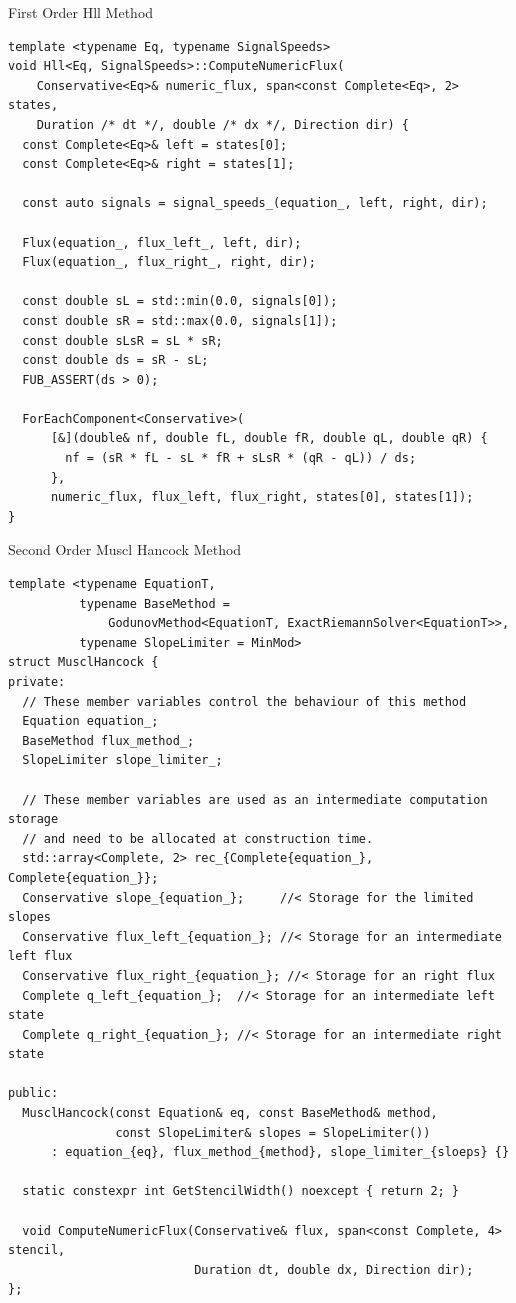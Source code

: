 \documentclass[ucs,9pt]{beamer}
\begin{document}
\begin{frame}[fragile]{First Order Hll Method}
\begin{lstlisting}
template <typename Eq, typename SignalSpeeds>
void Hll<Eq, SignalSpeeds>::ComputeNumericFlux(
    Conservative<Eq>& numeric_flux, span<const Complete<Eq>, 2> states,
    Duration /* dt */, double /* dx */, Direction dir) {
  const Complete<Eq>& left = states[0];
  const Complete<Eq>& right = states[1];

  const auto signals = signal_speeds_(equation_, left, right, dir);

  Flux(equation_, flux_left_, left, dir);
  Flux(equation_, flux_right_, right, dir);

  const double sL = std::min(0.0, signals[0]);
  const double sR = std::max(0.0, signals[1]);
  const double sLsR = sL * sR;
  const double ds = sR - sL;
  FUB_ASSERT(ds > 0);

  ForEachComponent<Conservative>(
      [&](double& nf, double fL, double fR, double qL, double qR) {
        nf = (sR * fL - sL * fR + sLsR * (qR - qL)) / ds;
      },
      numeric_flux, flux_left, flux_right, states[0], states[1]);
}
\end{lstlisting}
\end{frame}


\begin{frame}[fragile]{Second Order Muscl Hancock Method}
\begin{lstlisting}
template <typename EquationT,
          typename BaseMethod =
              GodunovMethod<EquationT, ExactRiemannSolver<EquationT>>,
          typename SlopeLimiter = MinMod>
struct MusclHancock {
private:
  // These member variables control the behaviour of this method
  Equation equation_;
  BaseMethod flux_method_;
  SlopeLimiter slope_limiter_;

  // These member variables are used as an intermediate computation storage
  // and need to be allocated at construction time.
  std::array<Complete, 2> rec_{Complete{equation_}, Complete{equation_}};
  Conservative slope_{equation_};     //< Storage for the limited slopes
  Conservative flux_left_{equation_}; //< Storage for an intermediate left flux
  Conservative flux_right_{equation_}; //< Storage for an right flux
  Complete q_left_{equation_};  //< Storage for an intermediate left state
  Complete q_right_{equation_}; //< Storage for an intermediate right state

public:
  MusclHancock(const Equation& eq, const BaseMethod& method, 
               const SlopeLimiter& slopes = SlopeLimiter())
      : equation_{eq}, flux_method_{method}, slope_limiter_{sloeps} {}

  static constexpr int GetStencilWidth() noexcept { return 2; }

  void ComputeNumericFlux(Conservative& flux, span<const Complete, 4> stencil,
                          Duration dt, double dx, Direction dir);
};
\end{lstlisting}
\end{frame}
\end{document}

